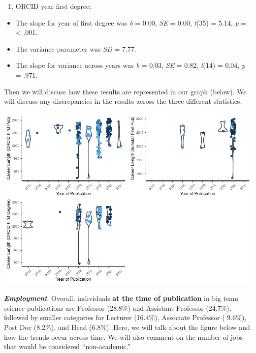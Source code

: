 \documentclass[
  english,
  man]{apa6}
\providecommand{\tightlist}{%
  \setlength{\itemsep}{0pt}\setlength{\parskip}{0pt}}
\begin{document}
\begin{enumerate}
\def\labelenumi{\arabic{enumi})}
\setcounter{enumi}{2}
\tightlist
\item
  ORCID year first degree:
\end{enumerate}

\begin{itemize}
\tightlist
\item
  The slope for year of first degree was \emph{b} = 0.00, \emph{SE} = 0.00, \emph{t}(35) = 5.14, \emph{p} = \textless{} .001.
\item
  The variance parameter was \emph{SD} = 7.77.
\item
  The slope for variance across years was \emph{b} = 0.03, \emph{SE} = 0.82, \emph{t}(14) = 0.04, \emph{p} = .971.
\end{itemize}

Then we will discuss how these results are represented in our graph (below). We will discuss any discrepancies in the results across the three different statistics.

\includegraphics{04.manuscript_files/figure-latex/figure2-1.pdf}

\textbf{\emph{Employment}}. Overall, individuals \textbf{at the time of publication} in big team science publications are Professor (28.8\%) and Assistant Professor (24.7\%), followed by smaller categories for Lecturer (16.4\%), Associate Professor ( 9.6\%), Post Doc (8.2\%), and Head (6.8\%). Here, we will talk about the figure below and how the trends occur across time. We will also comment on the number of jobs that would be considered ``non-academic.''
\end{document}
